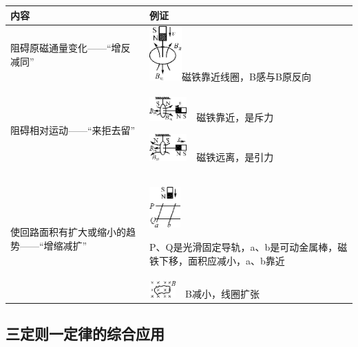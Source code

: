 \begin{longtable}[]{@{}m{3cm}m{7cm}@{}}
\toprule
内容 & 例证\tabularnewline
\midrule
\endhead

阻碍原磁通量变化------``增反减同''
& \begin{minipage}[t]{0.47\columnwidth}\raggedright
\includegraphics[width=0.49028in,height=0.82083in]{media/image392.png}磁铁靠近线圈，B感与B原反向\strut
\end{minipage}\tabularnewline

阻碍相对运动------``来拒去留''
& \begin{minipage}[t]{0.47\columnwidth}\raggedright
\includegraphics[width=0.56597in,height=0.36806in]{media/image393.png}　磁铁靠近，是斥力

\includegraphics[width=0.56597in,height=0.40556in]{media/image394.png}　磁铁远离，是引力\strut
\end{minipage}\tabularnewline
\multirow{2}{3cm}{使回路面积有扩大或缩小的趋势------``增缩减扩''}
& \begin{minipage}[t]{0.47\columnwidth}\raggedright

	\includegraphics[width=0.47153in,height=0.62292in]{media/image395.png}

P、Q是光滑固定导轨，a、b是可动金属棒，磁铁下移，面积应减小，a、b靠近\strut
\end{minipage}\tabularnewline
&
\includegraphics[width=0.39653in,height=0.25486in]{media/image396.png}　B减小，线圈扩张\tabularnewline
\bottomrule
\end{longtable}


\subsection{三定则一定律的综合应用}

